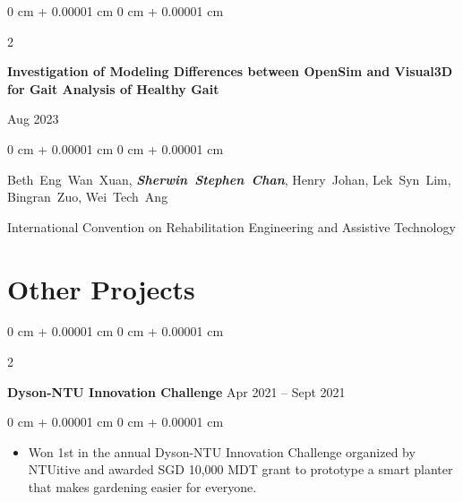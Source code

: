 \documentclass[10pt, letterpaper]{article}
\newenvironment{highlights}{
    \begin{itemize}[
        topsep=0.10 cm,
        parsep=0.10 cm,
        partopsep=0pt,
        itemsep=0pt,
        leftmargin=0 cm + 10pt
    ]
}{
    \end{itemize}
} %
\newenvironment{onecolentry}{
    \begin{adjustwidth}{
        0 cm + 0.00001 cm
    }{
        0 cm + 0.00001 cm
    }
}{
    \end{adjustwidth}
} %
\newenvironment{twocolentry}[2][]{
    \onecolentry
    \def\secondColumn{#2}
    \setcolumnwidth{\fill, 4.5 cm}
    \begin{paracol}{2}
}{
    \switchcolumn \raggedleft \secondColumn
    \end{paracol}
    \endonecolentry
} %
\begin{document}
        \vspace{0.2 cm}

        \begin{samepage}
            \begin{twocolentry}{
                Aug 2023
            }
                \textbf{Investigation of Modeling Differences between OpenSim and Visual3D for Gait Analysis of Healthy Gait}
            \end{twocolentry}

            \vspace{0.10 cm}
            
            \begin{onecolentry}
                \mbox{Beth Eng Wan Xuan}, \mbox{\textbf{\textit{Sherwin Stephen Chan}}}, \mbox{Henry Johan}, \mbox{Lek Syn Lim}, \mbox{Bingran Zuo}, \mbox{Wei Tech Ang}

                \vspace{0.10 cm}
                
        International Convention on Rehabilitation Engineering and Assistive Technology\end{onecolentry}
        \end{samepage}


    
    \section{Other Projects}



        
        \begin{twocolentry}{
            Apr 2021 – Sept 2021
        }
            \textbf{Dyson-NTU Innovation Challenge}\end{twocolentry}

        \vspace{0.10 cm}
        \begin{onecolentry}
            \begin{highlights}
                \item Won 1st in the annual Dyson-NTU Innovation Challenge organized by NTUitive and awarded SGD 10,000 MDT grant to prototype a smart planter that makes gardening easier for everyone.
            \end{highlights}
        \end{onecolentry}


        \vspace{0.2 cm}
\end{document}
